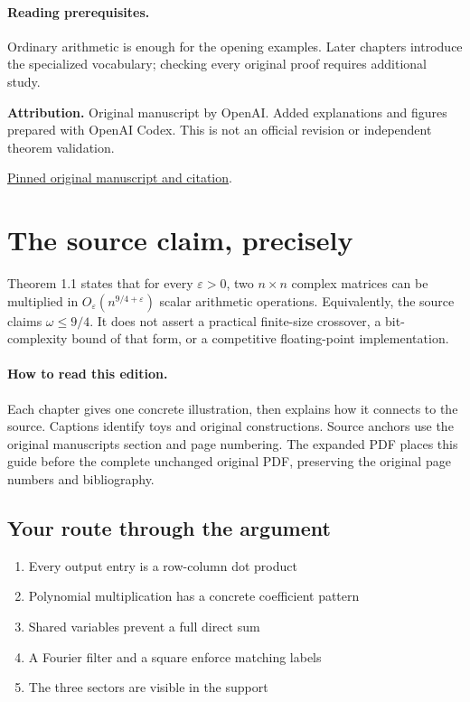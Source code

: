 \documentclass[11pt]{article}
\begin{document}
\paragraph{Reading prerequisites.} Ordinary arithmetic is enough for the opening examples. Later chapters introduce the specialized vocabulary; checking every original proof requires additional study.\par\textbf{Attribution.} Original manuscript by OpenAI. Added explanations and figures prepared with OpenAI Codex. This is not an official revision or independent theorem validation.\par\href{https://github.com/openai/math/tree/1581d4cbdd69a0faf34b2089614fe2a814316a6a/preprints/Matrix-Multiplication-Nine-Fourths-October-2-2026}{Pinned original manuscript and citation}.\newpage\section*{The source claim, precisely}Theorem 1.1 states that for every $\varepsilon>0$, two $n\times n$ complex matrices can be multiplied in $O_\varepsilon(n^{9/4+\varepsilon})$ scalar arithmetic operations. Equivalently, the source claims $\omega\le9/4$. It does not assert a practical finite-size crossover, a bit-complexity bound of that form, or a competitive floating-point implementation.\paragraph{How to read this edition.} Each chapter gives one concrete illustration, then explains how it connects to the source. Captions identify toys and original constructions. Source anchors use the original manuscript\textquotesingle s section and page numbering. The expanded PDF places this guide before the complete unchanged original PDF, preserving the original page numbers and bibliography.\subsection*{Your route through the argument}\begin{enumerate}\item Every output entry is a row-column dot product
\item Polynomial multiplication has a concrete coefficient pattern
\item Shared variables prevent a full direct sum
\item A Fourier filter and a square enforce matching labels
\item The three sectors are visible in the support

\end{enumerate}
\end{document}

